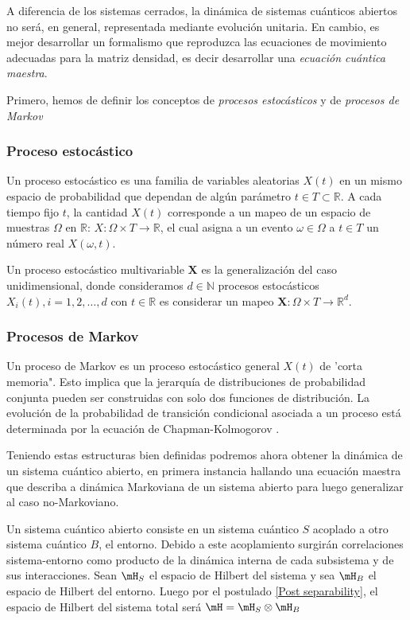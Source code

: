A diferencia de los sistemas cerrados, la dinámica de sistemas cuánticos abiertos no será, en general, representada mediante evolución unitaria. En cambio, es mejor desarrollar un formalismo que reproduzca las ecuaciones de movimiento adecuadas para la matriz densidad, es decir desarrollar una \textit{ecuación cuántica maestra}. 

Primero, hemos de definir los conceptos de
 \textit{procesos estocásticos} y de \textit{procesos de Markov} 

\subsubsection{Proceso estocástico}

Un proceso estocástico es una familia de variables aleatorias $X(t)$ en un mismo espacio de probabilidad que dependan de algún parámetro $t \in T \subset \mathbb{R}$.  A cada tiempo fijo $t$, la cantidad $X(t)$ corresponde a un mapeo de un espacio de muestras $\Omega$ en $\mathbb{R}$: $X : \Omega \times T \rightarrow \mathbb{R}$, el cual asigna a un evento $\omega \in \Omega$ a $t \in T$ un número real $X(\omega,t)$.

Un proceso estocástico multivariable $\mathbf{X}$ es la generalización del caso unidimensional, donde consideramos $d \in \mathbb{N}$ procesos estocásticos $X_i ({t}), i = 1,2,\ldots,d$ con  ${t} \in \mathbb{R}$ \ie es considerar un mapeo $\mathbf{X} : \Omega \times T \rightarrow \mathbb{R}^{d}$.

\subsubsection{Procesos de Markov}

Un proceso de Markov es un proceso estocástico general $X(t)$ de 'corta memoria". Esto implica que la jerarquía de distribuciones de probabilidad conjunta pueden ser construidas con solo dos funciones de distribución. La evolución de la probabilidad de transición condicional asociada a un proceso está determinada por la ecuación de Chapman-Kolmogorov \cite{HeinzPetruccione, Dynkin89}.

Teniendo estas estructuras bien definidas podremos ahora obtener la dinámica de un sistema cuántico abierto, en primera instancia hallando una ecuación maestra que describa a dinámica Markoviana de un sistema abierto para luego generalizar al caso no-Markoviano. 
 
Un sistema cuántico abierto consiste en un sistema cuántico $S$ acoplado a otro sistema cuántico $B$, el entorno. Debido a este acoplamiento surgirán correlaciones sistema-entorno como producto de la dinámica interna de cada subsistema y de sus interacciones.
Sean $\mH_S$ el espacio de Hilbert del sistema y sea $\mH_B$ el espacio de Hilbert del entorno. Luego por el postulado \ref{Post separability}, el espacio de Hilbert del sistema total será $\mH = \mH_S \otimes \mH_B$


